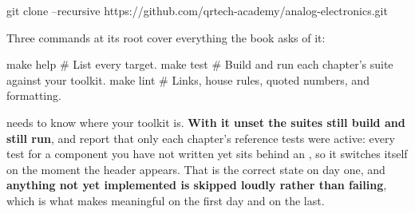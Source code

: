 \begin{shell}
git clone --recursive https://github.com/qrtech-academy/analog-electronics.git
\end{shell}

\noindent Three commands at its root cover everything the book asks of it:

\begin{shell}
make help                 # List every target.
make test                 # Build and run each chapter's suite against your toolkit.
make lint                 # Links, house rules, quoted numbers, and formatting.
\end{shell}

\noindent {} needs  to know where your toolkit is. \textbf{With it
unset the suites still build and still run}, and report that only each chapter's reference tests
were active: every test for a component you have not written yet sits behind an
, so it switches itself on the moment the header appears. That is the
correct state on day one, and \textbf{anything not yet implemented is skipped loudly rather than
failing}, which is what makes  meaningful on the first day and on the last.
